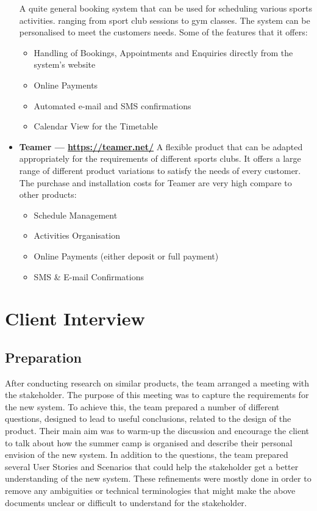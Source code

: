 \documentclass{l3proj}
\begin{document}
\begin{itemize}
A quite general booking system that can be used for scheduling various sports activities. ranging from sport club sessions to gym classes. The system can be personalised to meet the customers needs. Some of the features that it offers:
		\begin{itemize}
	\item Handling of Bookings, Appointments and Enquiries directly from the system's website
	\item Online Payments
	\item Automated e-mail and SMS confirmations
	\item Calendar View for the Timetable
		\end{itemize}
\item \textbf{Teamer --- \url{https://teamer.net/}}
A flexible product that can be adapted appropriately for the requirements of different sports clubs. It offers a large range of different product variations to satisfy the needs of every customer. The purchase and installation costs for Teamer are very high compare to other products:
		\begin{itemize}
	\item Schedule Management
	\item Activities Organisation
	\item Online Payments (either deposit or full payment)
	\item SMS \& E-mail Confirmations
		\end{itemize}
\end{itemize}
\section{Client Interview}

\subsection{Preparation}
After conducting research on similar products, the team arranged a meeting with the stakeholder.  The purpose of this meeting was to capture the requirements for the new system. To achieve this, the team  prepared a number of different questions, designed to lead to useful conclusions, related to the design of the product. Their main aim was to warm-up the discussion and encourage the client to talk about how the summer camp is organised and describe their personal envision of the new system. In addition to the questions, the team prepared several User Stories and Scenarios that could help the stakeholder get a better understanding of the new system. These refinements were mostly done in order to remove any ambiguities or technical terminologies that might make the above documents unclear or difficult to understand for the stakeholder.
\end{document}
